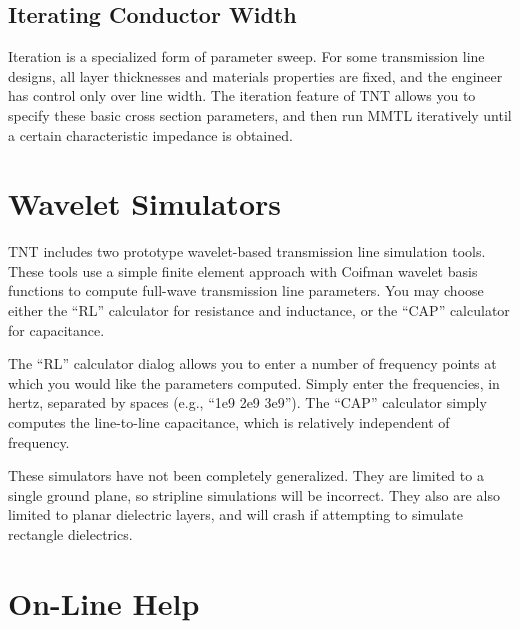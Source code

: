 \documentclass{article}
\begin{document}

\subsection {Iterating Conductor Width}

Iteration is a specialized form of parameter sweep.  For some
transmission line designs, all layer thicknesses and materials
properties are fixed, and the engineer has control only over line
width.  The iteration feature of TNT allows you to specify these basic
cross section parameters, and then run MMTL iteratively until a
certain characteristic impedance is obtained.





\section {Wavelet Simulators}

TNT includes two prototype wavelet-based transmission line simulation
tools.  These tools use a simple finite element approach with Coifman
wavelet basis functions to compute full-wave transmission line
parameters.  You may choose either the ``RL'' calculator for
resistance and inductance, or the ``CAP'' calculator for capacitance.

The ``RL'' calculator dialog allows you to enter a number of frequency
points at which you would like the parameters computed.  Simply enter
the frequencies, in hertz, separated by spaces (e.g., ``1e9 2e9
3e9'').  The ``CAP'' calculator simply computes the line-to-line
capacitance, which is relatively independent of frequency.

These simulators have not been completely generalized.  They are
limited to a single ground plane, so stripline simulations will be
incorrect.  They also are also limited to planar dielectric layers,
and will crash if attempting to simulate rectangle dielectrics.



\section {On-Line Help}
\end{document}
